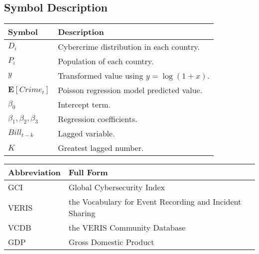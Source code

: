 \subsection{Symbol Description}\label{subsec:symbol-description} %
\begin{tabular}{ll}
    \textbf{Symbol} & \textbf{Description} \\
    \hline
    $D_i$                     & Cybercrime distribution in each country. \\
    $P_i$                     & Population of each country. \\
    $y$                       & Transformed value using \( y = \log(1 + x) \). \\
    $\mathbf{E}[Crime_t]$     & Poisson regression model predicted value. \\
    $\beta_0$                 & Intercept term. \\
    $\beta_1,\beta_2,\beta_3$ & Regression coefficients. \\
    $Bill_{t-k}$              & Lagged variable. \\
    $K$                       & Greatest lagged number. \\
\end{tabular}

\bigskip

\noindent
\begin{tabular}{ll}
    \textbf{Abbreviation} & \textbf{Full Form} \\
    \hline
    GCI   & Global Cybersecurity Index\cite{gci-2024} \\
    VERIS & the Vocabulary for Event Recording and Incident Sharing\cite{veris} \\
    VCDB  & the VERIS Community Database\cite{vcdb} \\
    GDP   & Gross Domestic Product \\
\end{tabular}

